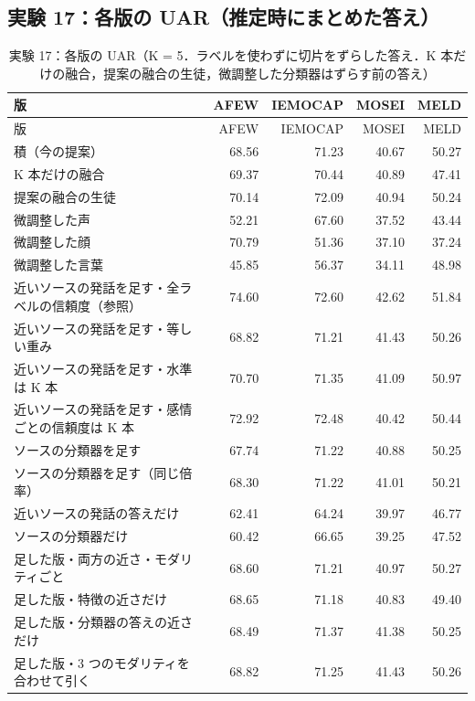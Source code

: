 \scriptsize\setlength{\tabcolsep}{2.5pt}\setlength{\LTcapwidth}{\textwidth}
\subsection*{実験 17：各版の UAR（推定時にまとめた答え）}
\begin{longtable}{>{\raggedright}p{8.2cm}rrrr}
\caption{実験 17：各版の UAR（K = 5．ラベルを使わずに切片をずらした答え．K 本だけの融合，提案の融合の生徒，微調整した分類器はずらす前の答え）}\\
\toprule
版 & AFEW & IEMOCAP & MOSEI & MELD \\
\midrule
\endfirsthead
\toprule
版 & AFEW & IEMOCAP & MOSEI & MELD \\
\midrule
\endhead
\bottomrule
\endfoot

積（今の提案） & 68.56 & 71.23 & 40.67 & 50.27 \\
K 本だけの融合 & 69.37 & 70.44 & 40.89 & 47.41 \\
提案の融合の生徒 & 70.14 & 72.09 & 40.94 & 50.24 \\
微調整した声 & 52.21 & 67.60 & 37.52 & 43.44 \\
微調整した顔 & 70.79 & 51.36 & 37.10 & 37.24 \\
微調整した言葉 & 45.85 & 56.37 & 34.11 & 48.98 \\
近いソースの発話を足す・全ラベルの信頼度（参照） & 74.60 & 72.60 & 42.62 & 51.84 \\
近いソースの発話を足す・等しい重み & 68.82 & 71.21 & 41.43 & 50.26 \\
近いソースの発話を足す・水準は K 本 & 70.70 & 71.35 & 41.09 & 50.97 \\
近いソースの発話を足す・感情ごとの信頼度は K 本 & 72.92 & 72.48 & 40.42 & 50.44 \\
ソースの分類器を足す & 67.74 & 71.22 & 40.88 & 50.25 \\
ソースの分類器を足す（同じ倍率） & 68.30 & 71.22 & 41.01 & 50.21 \\
近いソースの発話の答えだけ & 62.41 & 64.24 & 39.97 & 46.77 \\
ソースの分類器だけ & 60.42 & 66.65 & 39.25 & 47.52 \\
足した版・両方の近さ・モダリティごと & 68.60 & 71.21 & 40.97 & 50.27 \\
足した版・特徴の近さだけ & 68.65 & 71.18 & 40.83 & 49.40 \\
足した版・分類器の答えの近さだけ & 68.49 & 71.37 & 41.38 & 50.25 \\
足した版・3 つのモダリティを合わせて引く & 68.82 & 71.25 & 41.43 & 50.26 \\
\end{longtable}
